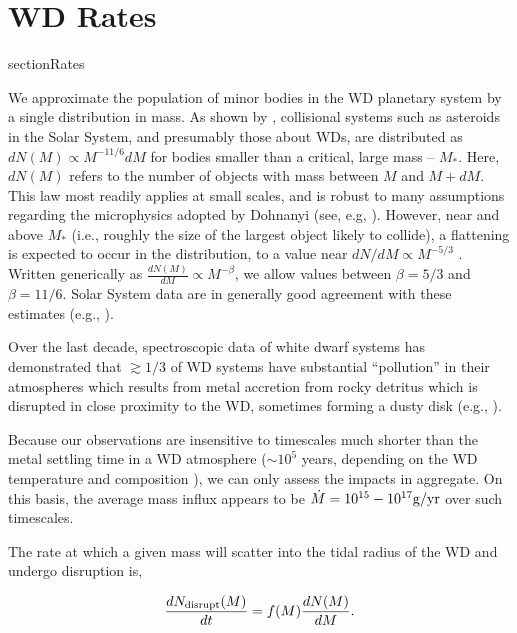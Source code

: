 \section{WD Rates}
section{Rates}


We approximate the population of minor bodies in the WD planetary system by a single distribution in mass.  As shown by \citet{Dohnanyi_1969}, collisional systems such as asteroids in the Solar System, and presumably those about WDs, are distributed as $dN(M) \propto M^{-11/6} dM$ for bodies smaller than a critical, large mass -- $M_*$.  Here, $dN(M)$ refers to the number of objects with mass between $M$ and $M+dM$.  This law most readily applies at small scales, and is robust to many assumptions regarding the microphysics adopted by Dohnanyi (see, e.g, \citealt{Williams_Wetherill_1994,Campo_Bagatin_1994}).  However, near and above $M_*$ (i.e., roughly the size of the largest object likely to collide), a flattening is expected to occur in the distribution, to a value near $dN/dM \propto M^{-5/3}$ \citep{Klacka_1992,Safronov_1979,Anders_1965}.  Written generically as $\frac{dN(M)}{dM} \propto M^{-\beta}$, we allow values between $\beta =5/3$ and $\beta = 11/6$.  Solar System data are in generally good agreement with these estimates (e.g., \citealt{Schlichting_2013,Fuentes_2010}).


Over the last decade, spectroscopic data of white dwarf systems has demonstrated that $\gtrsim 1/3$ of WD systems have substantial ``pollution'' in their atmospheres which results from metal accretion from rocky detritus which is disrupted in close proximity to the WD, sometimes forming a dusty disk (e.g., \citealt{Jura_2003, Jura_2008, Jura_2007, Jura_2007b, Reach_2009, Zuckerman_2010, Zuckerman_2012, Farihi_2012, Farihi_2013,Xu_2013}).


Because our observations are insensitive to timescales much shorter than the metal settling time in a WD atmosphere ($\sim 10^5$ years, depending on the WD temperature and composition \citealt{Koester_2009}), we can only assess the impacts in aggregate.  On this basis, the average mass influx appears to be $\dot{M} = 10^{15}-10^{17}{\rm g/yr}$ \citep{Zuckerman_2010,Barber_2012} over such timescales.  


The rate at which a given mass will scatter into the tidal radius of the WD and undergo disruption is,


\begin{equation}
\frac{dN_{\rm disrupt}(M)}{dt} = f(M) \frac{dN(M)}{dM}.
\end{equation}


